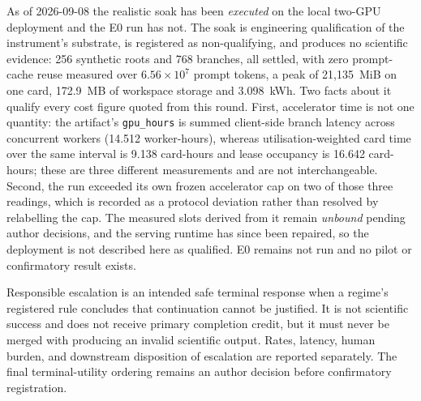 As of 2026-09-08 the realistic soak has been \emph{executed} on the local
two-GPU deployment and the E0 run has not.  The soak is engineering
qualification of the instrument's substrate, is registered as non-qualifying,
and produces no scientific evidence: 256 synthetic roots and 768 branches, all
settled, with zero prompt-cache reuse measured over $6.56\times10^{7}$ prompt
tokens, a peak of 21{,}135~MiB on one card, 172.9~MB of workspace storage and
3.098~kWh.  Two facts about it qualify every cost figure quoted from this
round.  First, accelerator time is not one quantity: the artifact's
\texttt{gpu\_hours} is summed client-side branch latency across concurrent
workers (14.512 worker-hours), whereas utilisation-weighted card time over the
same interval is 9.138 card-hours and lease occupancy is 16.642 card-hours;
these are three different measurements and are not interchangeable.  Second,
the run exceeded its own frozen accelerator cap on two of those three readings,
which is recorded as a protocol deviation rather than resolved by relabelling
the cap.  The measured slots derived from it remain \emph{unbound} pending
author decisions, and the serving runtime has since been repaired, so the
deployment is not described here as qualified.  E0 remains not run and no
pilot or confirmatory result exists.

Responsible escalation is an intended safe terminal response when a regime's
registered rule concludes that continuation cannot be justified.  It is not
scientific success and does not receive primary completion credit, but it must
never be merged with producing an invalid scientific output.  Rates, latency,
human burden, and downstream disposition of escalation are reported separately.
The final terminal-utility ordering remains an author decision before
confirmatory registration.

